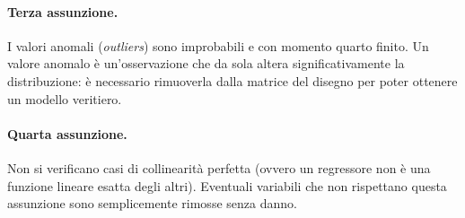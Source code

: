 \documentclass[11pt]{article}
\begin{document}
\paragraph{Terza assunzione.}
I valori anomali (\textit{outliers}) sono improbabili e con momento quarto finito.
Un valore anomalo è un'osservazione che da sola altera significativamente la distribuzione: è necessario rimuoverla dalla matrice del disegno per poter ottenere un modello veritiero.

\paragraph{Quarta assunzione.}
Non si verificano casi di collinearità perfetta (ovvero un regressore non è una funzione lineare esatta degli altri).
Eventuali variabili che non rispettano questa assunzione sono semplicemente rimosse senza danno.

\end{document}
